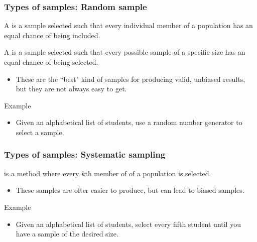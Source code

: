 \documentclass[xcolor=table, aspectratio=169, bigger, handout]{beamer}
\begin{document}
\begin{frame}
\frametitle{Types of samples: Random sample}

\begin{block}{}
A  is a sample selected such that every individual member of a population has an equal chance of being included.
\end{block}
\pause
\begin{block}{}
A  is a sample selected such that every possible sample of a specific size has an equal chance of being selected.
\begin{itemize}
\item These are the ``best" kind of samples for producing valid, unbiased results, but they are not always easy to get. 
\end{itemize}
\end{block}
\pause
\begin{exampleblock}{Example}
\begin{itemize}
\item Given an alphabetical list of students, use a random number generator to select a sample.
\end{itemize}
\end{exampleblock}

\end{frame}

\begin{frame}
\frametitle{Types of samples: Systematic sampling}

\begin{block}{}
 is a method where every $k$th member of of a population is selected.
\begin{itemize}
\item These samples are ofter easier to produce, but can lead to biased samples. 
\end{itemize}
\end{block}
\pause
\begin{exampleblock}{Example}
\begin{itemize}
\item Given an alphabetical list of students, select every fifth student until you have a sample of the desired size.
\end{itemize}
\end{exampleblock}

\end{frame}
\end{document}
